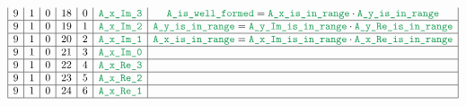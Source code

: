 \begin{figure}[h!]
\begin{adjustwidth}{-2cm}{-2cm}
{\[\begin{array}{|c|c|c|c|c|c|c|}
                    9                      & 1                                       & 0                                         & 18                     & 0                   & \locAXImThree & \locAIsWellFormed        =  \locAXIsInRange   \cdot \locAYIsInRange                                                                                               \\ \hline
                    9                      & 1                                       & 0                                         & 19                     & 1                   & \locAXImTwo   & \locAYIsInRange          =  \locAYImIsInRange \cdot \locAYReIsInRange                                                                                             \\ \hline
                    9                      & 1                                       & 0                                         & 20                     & 2                   & \locAXImOne   & \locAXIsInRange          =  \locAXImIsInRange \cdot \locAXReIsInRange                                                                                             \\ \hline
                    9                      & 1                                       & 0                                         & 21                     & 3                   & \locAXImZero  &                                                                                                                                                                   \\ \hline
                    9                      & 1                                       & 0                                         & 22                     & 4                   & \locAXReThree &                                                                                                                                                                   \\ \hline
                    9                      & 1                                       & 0                                         & 23                     & 5                   & \locAXReTwo   &                                                                                                                                                                   \\ \hline
                    9                      & 1                                       & 0                                         & 24                     & 6                   & \locAXReOne   &                                                                                                                                                                   \\ \hline

\end{array}\]}
\end{adjustwidth}
\end{figure}

